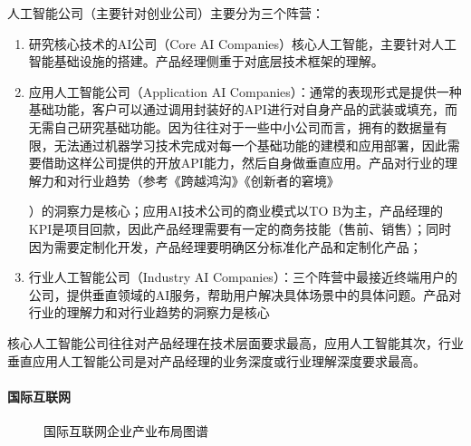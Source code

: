 \documentclass[letterpaper,10pt,english]{sphinxmanual}
\begin{document}
人工智能公司（主要针对创业公司）主要分为三个阵营：%
\begin{footnote}[724]\sphinxAtStartFootnote
{}
%
\end{footnote}
\begin{enumerate}
%
\item {} 
研究核心技术的AI公司（Core AI
Companies）核心人工智能，主要针对人工智能基础设施的搭建。产品经理侧重于对底层技术框架的理解。

\item {} 
应用人工智能公司（Application AI
Companies）：通常的表现形式是提供一种基础功能，客户可以通过调用封装好的API进行对自身产品的武装或填充，而无需自己研究基础功能。因为往往对于一些中小公司而言，拥有的数据量有限，无法通过机器学习技术完成对每一个基础功能的建模和应用部署，因此需要借助这样公司提供的开放API能力，然后自身做垂直应用。产品对行业的理解力和对行业趋势（参考《跨越鸿沟》《创新者的窘境》%
\begin{footnote}[725]\sphinxAtStartFootnote
{}
%
\end{footnote}）的洞察力是核心；应用AI技术公司的商业模式以TO
B为主，产品经理的KPI是项目回款，因此产品经理需要有一定的商务技能（售前、销售）；同时因为需要定制化开发，产品经理要明确区分标准化产品和定制化产品；

\item {} 
行业人工智能公司（Industry AI
Companies）：三个阵营中最接近终端用户的公司，提供垂直领域的AI服务，帮助用户解决具体场景中的具体问题。产品对行业的理解力和对行业趋势的洞察力是核心

\end{enumerate}

核心人工智能公司往往对产品经理在技术层面要求最高，应用人工智能其次，行业垂直应用人工智能公司是对产品经理的业务深度或行业理解深度要求最高。


\paragraph{国际互联网}
\label{\detokenize{chapter_project/AI_company:id3}}
\begin{figure}[H]
\centering
\capstart

\noindent{}
\caption{国际互联网企业产业布局图谱\sphinxfootnotemark[726]}\label{\detokenize{chapter_project/AI_company:id19}}\end{figure}
%
\begin{footnotetext}[726]\sphinxAtStartFootnote
{}
%
\end{footnotetext}\ignorespaces 
\end{document}
